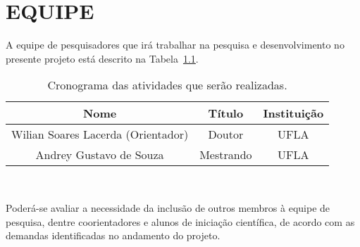 \chapter{EQUIPE}
\label{cap:equipe}

A equipe de pesquisadores que irá trabalhar na pesquisa e desenvolvimento no presente projeto está descrito na Tabela~\ref{tab:equipe}.

\begin{table}[!htb]
	\centering
	\caption{Cronograma das atividades que serão realizadas.}
	\label{tab:equipe}
	\begin{tabular}{ccc}
\hline
Nome & Título & Instituição \\ \hline
Wilian Soares Lacerda (Orientador) & Doutor & UFLA \\
Andrey Gustavo de Souza & Mestrando & UFLA \\ \hline
\end{tabular}\\
\end{table}

Poderá-se avaliar a necessidade da inclusão de outros membros à equipe de pesquisa, dentre coorientadores e alunos de iniciação científica, de acordo com as demandas identificadas no andamento do projeto.